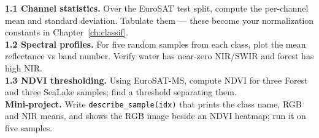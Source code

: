 \begin{exbox}
\textbf{1.1 Channel statistics.} Over the EuroSAT test split, compute the per-channel
mean and standard deviation. Tabulate them --- these become your normalization
constants in Chapter~\ref{ch:classif}.\\[2pt]
\textbf{1.2 Spectral profiles.} For five random samples from each class, plot the
mean reflectance vs band number. Verify water has near-zero NIR/SWIR and forest
has high NIR.\\[2pt]
\textbf{1.3 NDVI thresholding.} Using EuroSAT-MS, compute NDVI for three
\textsf{Forest} and three \textsf{SeaLake} samples; find a threshold separating
them.\\[2pt]
\textbf{Mini-project.} Write \texttt{describe\_sample(idx)} that prints the class
name, RGB and NIR means, and shows the RGB image beside an NDVI heatmap; run it
on five samples.
\end{exbox}
